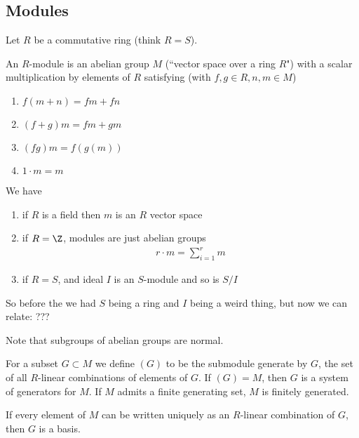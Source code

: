 \subsection{Modules}

Let $R$ be a commutative ring (think $R = S$).

\begin{definition}
An $R$-module is an abelian group $M$ (``vector space over a ring $R$") with a scalar multiplication by elements of $R$ satisfying (with $f,g \in R, n,m \in M$)
\begin{enumerate}
    \item $f(m+n) = fm+fn$
    \item $(f+g) m = fm+gm$
    \item $(fg)m = f(g(m))$
    \item $1 \cdot m = m$
\end{enumerate}
\end{definition}

\begin{example}
We have
\begin{enumerate}
    \item if $R$ is a field then $m$ is an $R$ vector space
    \item if $R = \Z$, modules are just abelian groups
    \begin{align*}
        r \cdot m = \sum_{i=1}^r m
    \end{align*}
    \item if $R = S$, and ideal $I$ is an $S$-module and so is $S/I$
\end{enumerate}
\end{example}

So before the we had $S$ being a ring and $I$ being a weird thing, but now we can relate: ???



Note that subgroups of abelian groups are normal.
\begin{definition}
For a subset $G \subset M$ we define $(G)$ to be the submodule generate by $G$, the set of all $R$-linear combinations of elements of $G$. If $(G) = M$, then $G$ is a system of generators for $M$. If $M$ admits a finite generating set, $M$ is finitely generated.
\end{definition}

\begin{definition}
If every element of $M$ can be written uniquely as an $R$-linear combination of $G$, then $G$ is a basis.
\end{definition}

